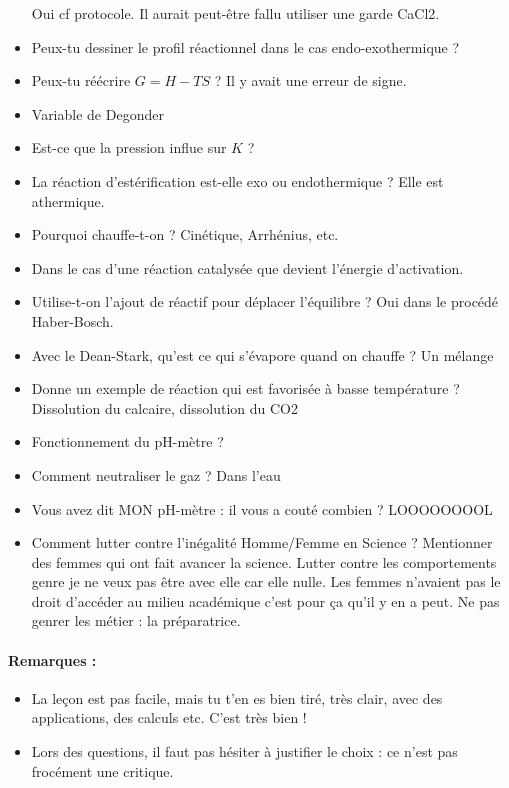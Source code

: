 \begin{itemize}
Oui cf protocole. Il aurait peut-être fallu utiliser une garde CaCl2.
\item Peux-tu dessiner le profil réactionnel dans le cas endo-exothermique ?
\item Peux-tu réécrire $G = H-TS$ ?
Il y avait une erreur de signe.
\item Variable de Degonder
\item Est-ce que la pression influe sur $K$ ?
\item La réaction d'estérification est-elle exo ou endothermique ?
Elle est athermique.
\item Pourquoi chauffe-t-on ? Cinétique, Arrhénius, etc.
\item Dans le cas d'une réaction catalysée que devient l'énergie d'activation.
\item Utilise-t-on l'ajout de réactif pour déplacer l'équilibre ?
Oui dans le procédé Haber-Bosch.
\item Avec le Dean-Stark, qu'est ce qui s'évapore quand on chauffe ?
Un mélange
\item Donne un exemple de réaction qui est favorisée à basse température ?
Dissolution du calcaire, dissolution du CO2
\item Fonctionnement du pH-mètre ?
\item Comment neutraliser le gaz ? Dans l'eau
\item Vous avez dit MON pH-mètre : il vous a couté combien ? LOOOOOOOOL
\item Comment lutter contre l'inégalité Homme/Femme en Science ?
Mentionner des femmes qui ont fait avancer la science.
Lutter contre les comportements genre je ne veux pas être avec elle car elle nulle.
Les femmes n'avaient pas le droit d'accéder au milieu académique c'est pour ça qu'il y en a peut.
Ne pas genrer les métier : la préparatrice.
\end{itemize}

\paragraph{Remarques :}
\begin{itemize}
\item La leçon est pas facile, mais tu t'en es bien tiré, très clair, avec des applications, des calculs etc. C'est très bien !
\item Lors des questions, il faut pas hésiter à justifier le choix : ce n'est pas frocément une critique.
\end{itemize}